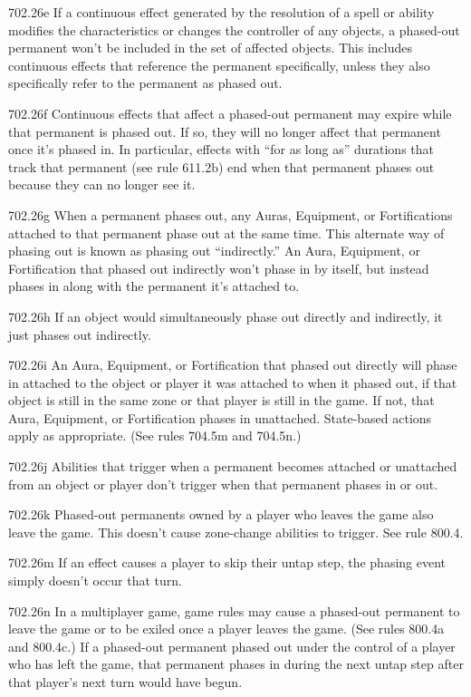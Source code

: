 702.26e If a continuous effect generated by the resolution of a spell or ability modifies the characteristics or changes the controller of any objects, a phased-out permanent won’t be included in the set of affected objects. This includes continuous effects that reference the permanent specifically, unless they also specifically refer to the permanent as phased out.

702.26f Continuous effects that affect a phased-out permanent may expire while that permanent is phased out. If so, they will no longer affect that permanent once it’s phased in. In particular, effects with “for as long as” durations that track that permanent (see rule 611.2b) end when that permanent phases out because they can no longer see it.

702.26g When a permanent phases out, any Auras, Equipment, or Fortifications attached to that permanent phase out at the same time. This alternate way of phasing out is known as phasing out “indirectly.” An Aura, Equipment, or Fortification that phased out indirectly won’t phase in by itself, but instead phases in along with the permanent it’s attached to.

702.26h If an object would simultaneously phase out directly and indirectly, it just phases out indirectly.

702.26i An Aura, Equipment, or Fortification that phased out directly will phase in attached to the object or player it was attached to when it phased out, if that object is still in the same zone or that player is still in the game. If not, that Aura, Equipment, or Fortification phases in unattached. State-based actions apply as appropriate. (See rules 704.5m and 704.5n.)

702.26j Abilities that trigger when a permanent becomes attached or unattached from an object or player don’t trigger when that permanent phases in or out.

702.26k Phased-out permanents owned by a player who leaves the game also leave the game. This doesn’t cause zone-change abilities to trigger. See rule 800.4.

702.26m If an effect causes a player to skip their untap step, the phasing event simply doesn’t occur that turn.

702.26n In a multiplayer game, game rules may cause a phased-out permanent to leave the game or to be exiled once a player leaves the game. (See rules 800.4a and 800.4c.) If a phased-out permanent phased out under the control of a player who has left the game, that permanent phases in during the next untap step after that player’s next turn would have begun.

